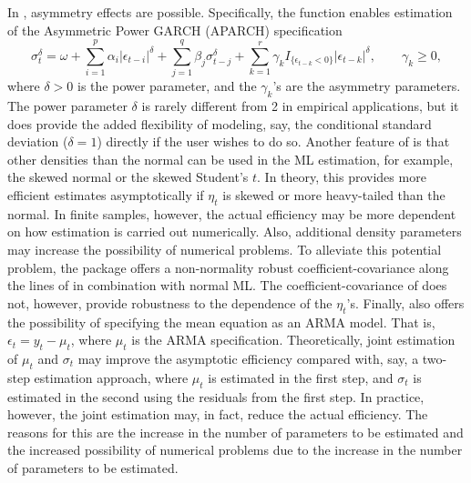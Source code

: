 In , asymmetry effects are possible. Specifically, the function  enables estimation of the Asymmetric Power GARCH (APARCH) specification
%
\begin{equation}\label{eq:aparch(p,q)}
	\sigma_t^\delta = \omega + \sum_{i=1}^p \alpha_i |\epsilon_{t-i}|^\delta + \sum_{j=1}^q \beta_j \sigma_{t-j}^\delta + \sum_{k=1}^r \gamma_k I_{ \{\epsilon_{t-k} < 0 \} } |\epsilon_{t-k}|^\delta, \qquad \gamma_k \geq 0,
\end{equation}
%
where $\delta>0$ is the power parameter, and the $\gamma_k$'s are the asymmetry parameters. The power parameter $\delta$ is rarely different from 2 in empirical applications, but it does provide the added flexibility of modeling, say, the conditional standard deviation ($\delta=1$) directly if the user wishes to do so. Another feature of  is that other densities than the normal can be used in the ML estimation, for example, the skewed normal or the skewed Student's $t$. In theory, this provides more efficient estimates asymptotically if $\eta_t$ is skewed or more heavy-tailed than the normal. In finite samples, however, the actual efficiency may be more dependent on how estimation is carried out numerically. Also, additional density parameters may increase the possibility of numerical problems. To alleviate this potential problem, the package offers a non-normality robust coefficient-covariance along the lines of \citet{Bollerslevetal92a} in combination with normal ML. The coefficient-covariance of \citet{Bollerslevetal92a} does not, however, provide robustness to the dependence of the $\eta_t$'s. Finally,  also offers the possibility of specifying the mean equation as an ARMA model. That is, $\epsilon_t = y_t - \mu_t$, where $\mu_t$ is the ARMA specification. Theoretically, joint estimation of $\mu_t$ and $\sigma_t$ may improve the asymptotic efficiency compared with, say, a two-step estimation approach, where $\mu_t$ is estimated in the first step, and $\sigma_t$ is estimated in the second using the residuals from the first step. In practice, however, the joint estimation may, in fact, reduce the actual efficiency. The reasons for this are the increase in the number of parameters to be estimated and the increased possibility of numerical problems due to the increase in the number of parameters to be estimated.

